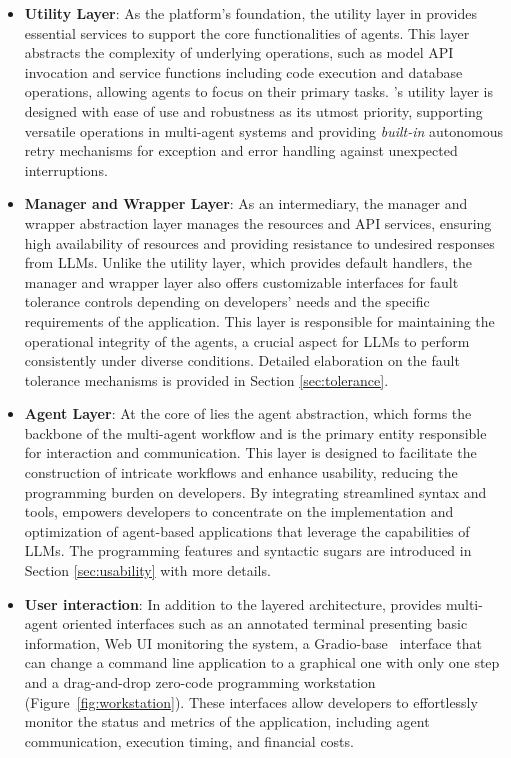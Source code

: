 \begin{itemize}
\item \textbf{Utility Layer}: As the platform's foundation, the utility layer in \ours provides essential services to support the core functionalities of agents. This layer abstracts the complexity of underlying operations, such as model API invocation and service functions including code execution and database operations, allowing agents to focus on their primary tasks. 
\ours's utility layer is designed with ease of use and robustness as its utmost priority, supporting versatile operations in multi-agent systems and providing \emph{built-in} autonomous retry mechanisms for exception and error handling against unexpected interruptions.

\item \textbf{Manager and Wrapper Layer}: As an intermediary, the manager and wrapper abstraction layer manages the resources and API services, ensuring high availability of resources and providing resistance to undesired responses from LLMs. 
Unlike the utility layer, which provides default handlers, the manager and wrapper layer also offers customizable interfaces for fault tolerance controls depending on developers' needs and the specific requirements of the application. 
This layer is responsible for maintaining the operational integrity of the agents, a crucial aspect for LLMs to perform consistently under diverse conditions. Detailed elaboration on the fault tolerance mechanisms is provided in Section \ref{sec:tolerance}.

\item \textbf{Agent Layer}: At the core of \ours lies the agent abstraction, which forms the backbone of the multi-agent workflow and is the primary entity responsible for interaction and communication. This layer is designed to facilitate the construction of intricate workflows and enhance usability, reducing the programming burden on developers. 
By integrating streamlined syntax and tools, \ours empowers developers to concentrate on the implementation and optimization of agent-based applications that leverage the capabilities of LLMs. 
The programming features and syntactic sugars are introduced in Section \ref{sec:usability} with more details.

\item \textbf{User interaction}: In addition to the layered architecture, \ours provides multi-agent oriented interfaces such as an annotated terminal presenting basic information, Web UI monitoring the system, a Gradio-base~\citep{abid2019gradio} interface that can change a command line application to a graphical one with only one step and a drag-and-drop zero-code programming workstation (Figure~\ref{fig:workstation}). These interfaces allow developers to effortlessly monitor the status and metrics of the application, including agent communication, execution timing, and financial costs.

\end{itemize}

